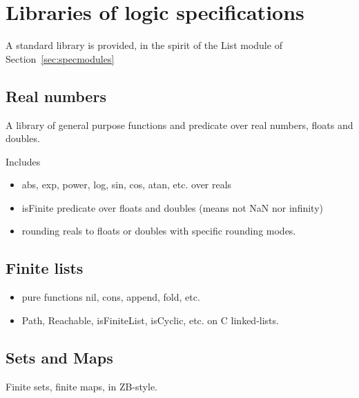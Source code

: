 \section{Libraries of logic specifications}
\label{sec:speclibraries}

A standard library is provided, in the spirit of the List module of
Section~\ref{sec:specmodules}


\subsection{Real numbers}
\label{sec:libreal}

A library of general purpose functions and predicate over real
numbers, floats and doubles.

Includes 

\begin{itemize}
\item abs, exp, power, log, sin, cos, atan, etc. over reals

\item isFinite predicate over floats and doubles (means not NaN nor infinity)

\item rounding reals to floats or doubles with specific rounding modes.

\end{itemize}

\subsection{Finite lists}

\begin{itemize}
\item pure functions nil, cons, append, fold, etc.
\item Path, Reachable, isFiniteList, isCyclic, etc. on C linked-lists.
\end{itemize}


\subsection{Sets and Maps}

Finite sets, finite maps, in ZB-style.




